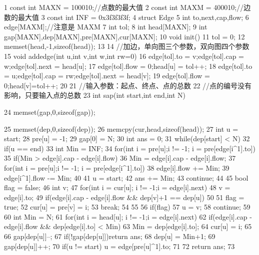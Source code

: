 \documentclass[11pt]{article}
\begin{document}
\begin{Code}
 1   const int MAXN = 100010;//点数的最大值
 2   const int MAXM = 400010;//边数的最大值
 3   const int INF = 0x3f3f3f3f;
 4   struct Edge{
 5       int to,next,cap,flow;
 6   }edge[MAXM];//注意是 MAXM
 7   int tol;
 8   int head[MAXN];
 9   int gap[MAXN],dep[MAXN],pre[MAXN],cur[MAXN];
10   void init(){
11       tol = 0;
12       memset(head,-1,sizeof(head));
13   }
14   //加边，单向图三个参数，双向图四个参数
15   void addedge(int u,int v,int w,int rw=0){
16       edge[tol].to = v;edge[tol].cap = w;edge[tol].next = head[u];
17       edge[tol].flow = 0;head[u] = tol++;
18       edge[tol].to = u;edge[tol].cap = rw;edge[tol].next = head[v];
19       edge[tol].flow = 0;head[v]=tol++;
20   }
21   //输入参数：起点、终点、点的总数
22   //点的编号没有影响，只要输入点的总数
23   int sap(int start,int end,int N){
24       memset(gap,0,sizeof(gap));


25       memset(dep,0,sizeof(dep));
26       memcpy(cur,head,sizeof(head));
27       int u = start;
28       pre[u] = -1;
29       gap[0] = N;
30       int ans = 0;
31       while(dep[start] < N){
32           if(u == end){
33               int Min = INF;
34               for(int i = pre[u];i != -1; i = pre[edge[i^1].to])
35                    if(Min > edge[i].cap - edge[i].flow)
36                            Min = edge[i].cap - edge[i].flow;
37               for(int i = pre[u];i != -1; i = pre[edge[i^1].to]){
38                    edge[i].flow += Min;
39                    edge[i^1].flow -= Min;
40               }
41               u = start;
42               ans += Min;
43               continue;
44           }
45           bool flag = false;
46           int v;
47           for(int i = cur[u]; i != -1;i = edge[i].next){
48               v = edge[i].to;
49               if(edge[i].cap - edge[i].flow && dep[v]+1 == dep[u])
50               {
51                    flag = true;
52                    cur[u] = pre[v] = i;
53                    break;
54               }
55           }
56           if(flag){
57               u = v;
58               continue;
59           }
60           int Min = N;
61           for(int i = head[u]; i != -1;i = edge[i].next)
62               if(edge[i].cap - edge[i].flow && dep[edge[i].to] < Min)
                    {
63                    Min = dep[edge[i].to];
64                    cur[u] = i;
65               }
66           gap[dep[u]]--;
67           if(!gap[dep[u]])return ans;
68           dep[u] = Min+1;
69           gap[dep[u]]++;
70           if(u != start) u = edge[pre[u]^1].to;
71       }
72       return ans;
73 }
\end{Code}
\end{document}
